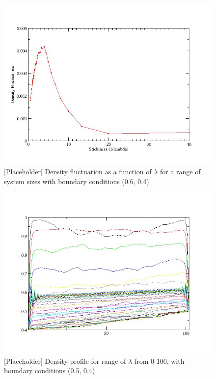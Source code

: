 \documentclass[
reprint, amsmath,amssymb, aps,
]{revtex4-1}
\begin{document}
\begin{figure}[h!]
\vspace{1em}
\begin{center}
    \includegraphics[width=0.5\linewidth]{densityFluct.jpg}
\end{center}
    \vspace{-0em}
\caption{\label{fig:DenFluc} [Placeholder] Density fluctuation 
as a function of $\lambda$
 for a  range of system sizes 
 with boundary conditions
  (0.6, 0.4) }
\end{figure}

\begin{figure}[h!]
\vspace{1em}
\begin{center}
    \includegraphics[width=0.5\linewidth]{profile.jpg}
\end{center}
    \vspace{-0em}
\caption{\label{fig:DenProfile} [Placeholder] Density profile for
  range of $\lambda$ from 0-100, with boundary conditions (0.5, 0.4) }
\end{figure}
\end{document}
